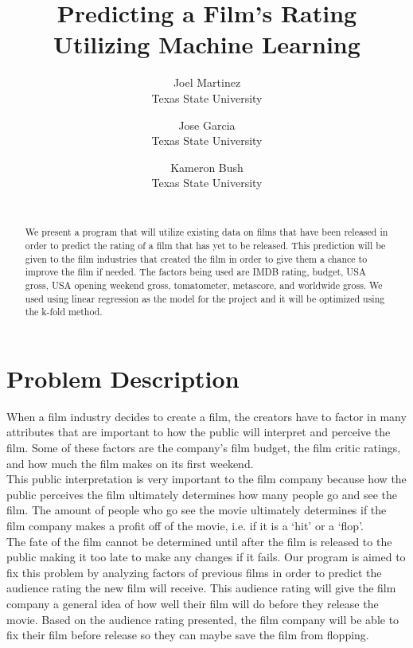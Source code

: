 \documentclass[10pt,twocolumn,letterpaper]{article}
\begin{document}
\title{Predicting a Film's Rating Utilizing Machine Learning}

\author{Joel Martinez\\
Texas State University\\
\and
Jose Garcia\\
Texas State University\\
\and
Kameron Bush\\
Texas State University\\\\
}
\maketitle

\begin{abstract}
	We present a program that will utilize existing data on films that have been released in order to predict
	the rating of a film that has yet to be released. This prediction will be given to the film industries that created the film in order to give them a chance to improve the film if needed. The factors being used are IMDB rating, budget, USA gross, USA opening weekend gross, tomatometer, metascore, and worldwide gross. We used using linear regression as the model for the project and it will be optimized using the k-fold method.
\end{abstract}

\section{Problem Description}
	When a film industry decides to create a film, the creators have to factor in many attributes that are important to how the public will interpret and perceive the film. Some of these factors are the company’s film budget, the film critic ratings, and how much the film makes on its first weekend.\\
	This public interpretation is very important to the film company because how the public perceives the film ultimately determines how many people go and see the film. The amount of people who go see the movie ultimately determines if the film company makes a profit off of the movie, i.e. if it is a ‘hit’ or a ‘flop’.\\
	The fate of the film cannot be determined until after the film is released to the public making it too late to make any changes if it fails. Our program is aimed to fix this problem by analyzing factors of previous films in order to predict the audience rating the new film will receive. This audience rating will give the film company a general idea of how well their film will do before they release the movie. Based on the audience rating presented, the film company will be able to fix their film before release so they can maybe save the film from flopping.
\end{document}
